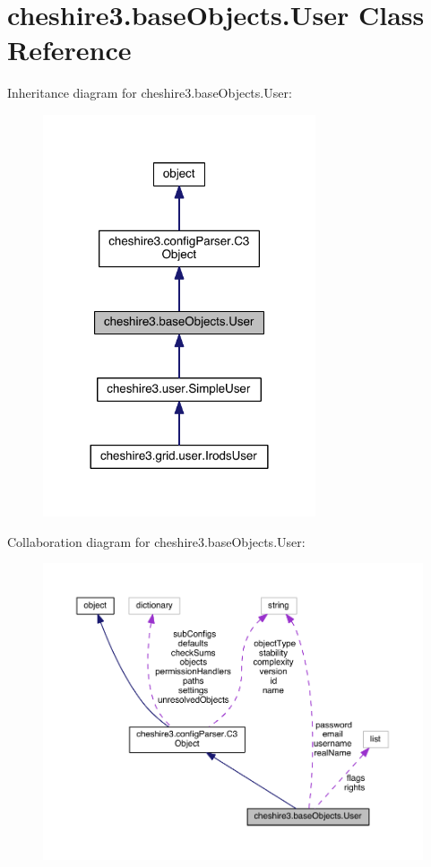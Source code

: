 \hypertarget{classcheshire3_1_1base_objects_1_1_user}{\section{cheshire3.\-base\-Objects.\-User Class Reference}
\label{classcheshire3_1_1base_objects_1_1_user}
}


Inheritance diagram for cheshire3.\-base\-Objects.\-User\-:
\nopagebreak
\begin{figure}[H]
\begin{center}
\leavevmode
\includegraphics[width=228pt]{classcheshire3_1_1base_objects_1_1_user__inherit__graph}
\end{center}
\end{figure}


Collaboration diagram for cheshire3.\-base\-Objects.\-User\-:
\nopagebreak
\begin{figure}[H]
\begin{center}
\leavevmode
\includegraphics[width=350pt]{classcheshire3_1_1base_objects_1_1_user__coll__graph}
\end{center}
\end{figure}
